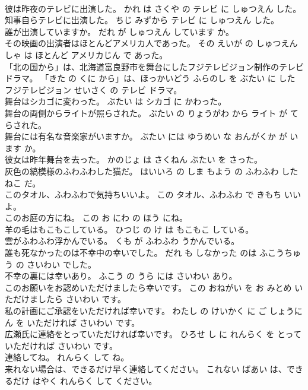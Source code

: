 \documentclass[8pt]{extreport}
\begin{document}
\begin{CJK}{UTF8}{min}
\\	彼は昨夜のテレビに出演した。	かれ は さくや の テレビ に しゅつえん した。	
\\	知事自らテレビに出演した。	ちじ みずから テレビ に しゅつえん した。	
\\	誰が出演していますか。	だれ が しゅつえん しています か。	
\\	その映画の出演者はほとんどアメリカ人であった。	その えいが の しゅつえん しゃ は ほとんど アメリカじん で あった。	
\\	「北の国から」は、北海道富良野市を舞台にしたフジテレビジョン制作のテレビドラマ。	「きた の くに から」は、ほっかいどう ふらのし を ぶたい に した フジテレビジョン せいさく の テレビ ドラマ。	
\\	舞台はシカゴに変わった。	ぶたい は シカゴ に かわった。	
\\	舞台の両側からライトが照らされた。	ぶたい の りょうがわ から ライト が てらされた。	
\\	舞台には有名な音楽家がいますか。	ぶたい には ゆうめい な おんがくか が います か。	
\\	彼女は昨年舞台を去った。	かのじょ は さくねん ぶたい を さった。	
\\	灰色の縞模様のふわふわした猫だ。	はいいろ の しま もよう の ふわふわ した ねこ だ。	
\\	このタオル、ふわふわで気持ちいいよ。	この タオル、ふわふわ で きもち いい よ。	
\\	このお庭の方にね。	この お にわ の ほう にね。	
\\	羊の毛はもこもこしている。	ひつじ の け は もこもこ している。	
\\	雲がふわふわ浮かんでいる。	くも が ふわふわ うかんでいる。	
\\	誰も死なかったのは不幸中の幸いでした。	だれ も しなかった のは ふこうちゅう の さいわい でした。	
\\	不幸の裏には幸いあり。	ふこう の うら には さいわい あり。	
\\	このお願いをお認めいただけましたら幸いです。	この おねがい を お みとめ いただけましたら さいわい です。	
\\	私の計画にご承認をいただければ幸いです。	わたし の けいかく に ご しょうにん を いただければ さいわい です。	
\\	広瀬氏に連絡をとっていただければ幸いです。	ひろせ し に れんらく を とって いただければ さいわい です。	
\\	連絡してね。	れんらく して ね。	
\\	来れない場合は、できるだけ早く連絡してください。	これない ばあい は、できるだけ はやく れんらく して ください。	

\end{CJK}
\end{document}
